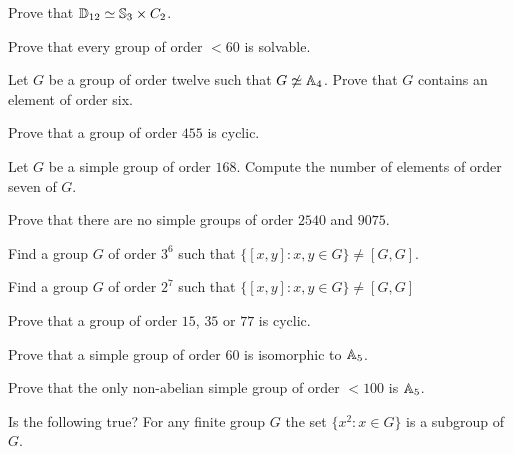 \begin{prob}
  Prove that $\mathbb{D}_{12}\simeq\mathbb{S}_3\times C_2$.
\end{prob}

\begin{prob}
  Prove that every group of order $<60$ is solvable.
\end{prob}

\begin{prob}
  Let $G$ be a group of order twelve such that $G\not\simeq\mathbb{A}_4$. Prove that
  $G$ contains an element of order six.
\end{prob}

\begin{prob}
  Prove that a group of order $455$ is cyclic.
\end{prob}

%
\begin{prob}
  Let $G$ be a simple group of order $168$. Compute the number of elements of
  order seven of $G$.
\end{prob}

\begin{prob}
  Prove that there are no simple groups of order $2540$ and $9075$.
\end{prob}

\begin{prob}
  Find a group $G$ of order $3^6$ such that 
  $\{[x,y]:x,y\in G\}\ne[G,G]$.
\end{prob}

\begin{prob}
  Find a group $G$ of order $2^7$ such that $\{[x,y]:x,y\in G\}\ne [G,G]$ 
\end{prob}

\begin{prob}
  Prove that a group of order $15$, $35$ or $77$ is cyclic.
\end{prob}

\begin{prob}
  Prove that a simple group of order $60$ is isomorphic to $\mathbb{A}_5$.
\end{prob}

\begin{prob}
  Prove that the only non-abelian simple group of order $<100$ is $\mathbb{A}_5$.
\end{prob}

\begin{prob}
  Is the following true? For any finite group $G$ the set $\{x^2:x\in G\}$ is a
  subgroup of $G$.
\end{prob}


